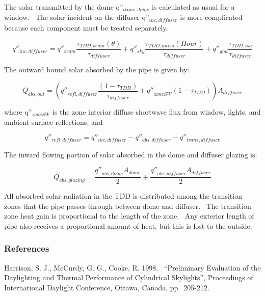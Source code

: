 The solar transmitted by the dome q''\(_{trans,dome}\) is calculated as usual for a window.~ The solar incident on the diffuser q''\(_{inc,diffuser}\) is more complicated because each component must be treated separately.

\begin{equation}
{q''_{inc,diffuser}} = {q''_{beam}}\frac{{{\tau_{TDD,beam}}(\theta )}}{{{\tau_{diffuser}}}} + {q''_{sky}}\frac{{{\tau_{TDD,aniso}}(Hour)}}{{{\tau_{diffuser}}}} + {q''_{gnd}}\frac{{{\tau_{TDD,iso}}}}{{{\tau_{diffuser}}}}
\end{equation}

The outward bound solar absorbed by the pipe is given by:

\begin{equation}
{Q_{abs,out}} = \left( {{{q''}_{refl,diffuser}}\frac{{\left( {1 - {\tau_{TDD}}} \right)}}{{{\tau_{diffuser}}}} + {{q''}_{zoneSW}}\left( {1 - {\tau_{TDD}}} \right)} \right){A_{diffuser}}
\end{equation}

where q''\(_{zoneSW}\) is the zone interior diffuse shortwave flux from window, lights, and ambient surface reflections, and

\begin{equation}
{q''_{refl,diffuser}} = {q''_{inc,diffuser}} - {q''_{abs,diffuser}} - {q''_{trans,diffuser}}
\end{equation}

The inward flowing portion of solar absorbed in the dome and diffuser glazing is:

\begin{equation}
{Q_{abs,glazing}} = \frac{{{{q''}_{abs,dome}}{A_{dome}}}}{2} + \frac{{{{q''}_{abs,diffuser}}{A_{diffuser}}}}{2}
\end{equation}

All absorbed solar radiation in the TDD is distributed among the transition zones that the pipe passes through between dome and diffuser.~ The transition zone heat gain is proportional to the length of the zone.~ Any exterior length of pipe also receives a proportional amount of heat, but this is lost to the outside.

\subsubsection{References}\label{references-016}

Harrison, S. J., McCurdy, G. G., Cooke, R. 1998.~ ``Preliminary Evaluation of the Daylighting and Thermal Performance of Cylindrical Skylights'', Proceedings of International Daylight Conference, Ottawa, Canada, pp.~205-212.

